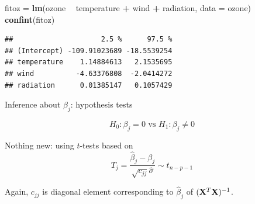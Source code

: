 \documentclass[10pt,ignorenonframetext,]{beamer}
\newenvironment{Shaded}{\begin{snugshade}}{\end{snugshade}}
\newcommand{\KeywordTok}[1]{\textcolor[rgb]{0.13,0.29,0.53}{\textbf{#1}}}
\newcommand{\DataTypeTok}[1]{\textcolor[rgb]{0.13,0.29,0.53}{#1}}
\newcommand{\StringTok}[1]{\textcolor[rgb]{0.31,0.60,0.02}{#1}}
\newcommand{\OperatorTok}[1]{\textcolor[rgb]{0.81,0.36,0.00}{\textbf{#1}}}
\newcommand{\NormalTok}[1]{#1}
\begin{document}
\begin{frame}[fragile]

\footnotesize

\begin{Shaded}
\begin{Highlighting}[]
\NormalTok{fitoz =}\StringTok{ }\KeywordTok{lm}\NormalTok{(ozone }\OperatorTok{~}\StringTok{ }\NormalTok{temperature }\OperatorTok{+}\StringTok{ }\NormalTok{wind }\OperatorTok{+}\StringTok{ }\NormalTok{radiation, }\DataTypeTok{data =}\NormalTok{ ozone)}
\KeywordTok{confint}\NormalTok{(fitoz)}
\end{Highlighting}
\end{Shaded}

\begin{verbatim}
##                     2.5 %      97.5 %
## (Intercept) -109.91023689 -18.5539254
## temperature    1.14884613   2.1535695
## wind          -4.63376808  -2.0414272
## radiation      0.01385147   0.1057429
\end{verbatim}

\normalsize

\end{frame}

\begin{frame}

\begin{block}{Inference about \(\beta_j\): hypothesis tests}

\[H_0: \beta_j=0 \text{ vs } H_1: \beta_j\neq 0\]

Nothing new: using \(t\)-tests based on
\[ T_j=\frac{\hat{\beta}_j-\beta_j}{\sqrt{c_{jj}}\hat{\sigma}}\sim t_{n-p-1}\]

Again, \(c_{jj}\) is diagonal element corresponding to \(\hat{\beta}_j\)
of \(({\bf X}^T{\bf X})^{-1}\).

\end{block}

\end{frame}
\end{document}
